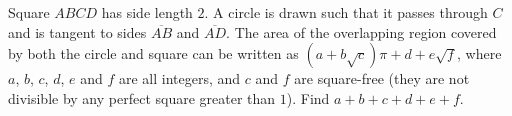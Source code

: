 Square $ABCD$ has side length $2$. A circle is drawn such that it passes through $C$ and is tangent to sides $\overline{AB}$ and $\overline{AD}$. The area of the overlapping region covered by both the circle and square can be written as $(a+b\sqrt{c})\pi +d+e\sqrt{f}$, where $a$, $b$, $c$, $d$, $e$ and $f$ are all integers, and $c$ and $f$ are square-free (they are not divisible by any perfect square greater than $1$). Find $a+b+c+d+e+f$.
